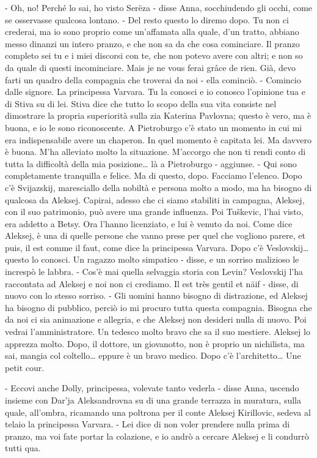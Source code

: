 - Oh, no! Perché lo sai, ho visto Serëza - disse Anna, socchiudendo gli occhi, come se osservasse qualcosa lontano. - Del resto questo lo diremo dopo. Tu non ci crederai, ma io sono proprio come un'affamata alla quale, d'un tratto, abbiano messo dinanzi un intero pranzo, e che non sa da che cosa cominciare. Il pranzo completo sei tu e i miei discorsi con te, che non potevo avere con altri; e non so da quale di questi incominciare. Mais je ne vous ferai grâce de rien. Già, devo farti un quadro della compagnia che troverai da noi - ella cominciò. - Comincio dalle signore. La principessa Varvara. Tu la conosci e io conosco l'opinione tua e di Stiva su di lei. Stiva dice che tutto lo scopo della sua vita consiste nel dimostrare la propria superiorità sulla zia Katerina Pavlovna; questo è vero, ma è buona, e io le sono riconoscente. A Pietroburgo c'è stato un momento in cui mi era indispensabile avere un chaperon. In quel momento è capitata lei. Ma davvero è buona. M'ha alleviato molto la situazione. M'accorgo che non ti rendi conto di tutta la difficoltà della mia posizione\ldots{} là a Pietroburgo - aggiunse. - Qui sono completamente tranquilla e felice. Ma di questo, dopo. Facciamo l'elenco. Dopo c'è Svijazskij, maresciallo della nobiltà e persona molto a modo, ma ha bisogno di qualcosa da Aleksej. Capirai, adesso che ci siamo stabiliti in campagna, Aleksej, con il suo patrimonio, può avere una grande influenza. Poi Tuškevic, l'hai visto, era addetto a Betsy. Ora l'hanno licenziato, e lui è venuto da noi. Come dice Aleksej, è una di quelle persone che vanno prese per quel che vogliono parere, et puis, il est comme il faut, come dice la principessa Varvara. Dopo c'è Veslovskij\ldots{} questo lo conosci. Un ragazzo molto simpatico - disse, e un sorriso malizioso le increspò le labbra. - Cos'è mai quella selvaggia storia con Levin? Veslovskij l'ha raccontata ad Aleksej e noi non ci crediamo. Il est très gentil et näif - disse, di nuovo con lo stesso sorriso. - Gli uomini hanno bisogno di distrazione, ed Aleksej ha bisogno di pubblico, perciò io mi procuro tutta questa compagnia. Bisogna che da noi ci sia animazione e allegria, e che Aleksej non desideri nulla di nuovo. Poi vedrai l'amministratore. Un tedesco molto bravo che sa il suo mestiere. Aleksej lo apprezza molto. Dopo, il dottore, un giovanotto, non è proprio un nichilista, ma sai, mangia col coltello\ldots{} eppure è un bravo medico. Dopo c'è l'architetto\ldots{} Une petit cour. 

\label{xx-5} 

- Eccovi anche Dolly, principessa, volevate tanto vederla - disse Anna, uscendo insieme con Dar'ja Aleksandrovna su di una grande terrazza in muratura, sulla quale, all'ombra, ricamando una poltrona per il conte Aleksej Kirillovic, sedeva al telaio la principessa Varvara. - Lei dice di non voler prendere nulla prima di pranzo, ma voi fate portar la colazione, e io andrò a cercare Aleksej e li condurrò tutti qua. 

